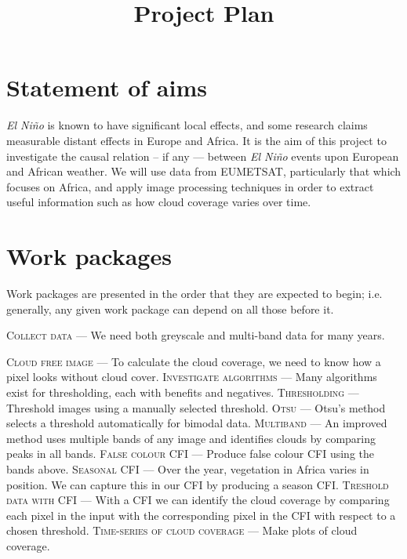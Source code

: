 \documentclass[12pt,preprint]{article}
\title{Project Plan}
\date{}
\newcommand{\elnino}[0]{\emph{El Ni\~no}}
\newcommand{\workpackage}[2]{\textsc{#1} --- #2}
\begin{document}
\section{Statement of aims}

\elnino{} is known to have significant local effects, and some
research claims measurable distant effects in Europe and Africa. It is
the aim of this project to investigate the causal relation -- if any ---
between \elnino{} events upon European and African weather. We will
use data from EUMETSAT, particularly that which focuses on Africa, and
apply image processing techniques in order to extract useful
information such as how cloud coverage varies over time.

\section{Work packages}

Work packages are presented in the order that they are expected to
begin; i.e. generally, any given work package can depend on all those
before it.

\vspace{.1cm}

\workpackage{Collect data}{We need both greyscale and multi-band data
  for many years.}

\vspace{.1cm}

\workpackage{Cloud free image}{To calculate the cloud coverage, we
  need to know how a pixel looks without cloud cover.}
\workpackage{Investigate algorithms}{Many algorithms exist for
  thresholding, each with benefits and negatives.}
\workpackage{Thresholding}{Threshold images using a manually selected
  threshold.} \workpackage{Otsu}{Otsu's method selects a threshold
  automatically for bimodal data.} \workpackage{Multiband}{An improved
  method uses multiple bands of any image and identifies clouds by
  comparing peaks in all bands.} \workpackage{False colour
  CFI}{Produce false colour CFI using the bands above.}
\workpackage{Seasonal CFI}{Over the year, vegetation in Africa varies
  in position. We can capture this in our CFI by producing a season
  CFI.} \workpackage{Treshold data with CFI}{With a CFI we can
  identify the cloud coverage by comparing each pixel in the input
  with the corresponding pixel in the CFI with respect to a chosen
  threshold.} \workpackage{Time-series of cloud coverage}{Make plots
  of cloud coverage}.

\vspace{.1cm}
\end{document}
